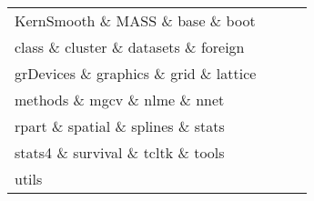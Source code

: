 \begin{tabular}{llll} 
KernSmooth \& MASS \& base \& boot\\ 
class \& cluster \& datasets \& foreign\\ 
grDevices \& graphics \& grid \& lattice\\ 
methods \& mgcv \& nlme \& nnet\\ 
rpart \& spatial \& splines \& stats\\ 
stats4 \& survival \& tcltk \& tools\\ 
utils  &   &   &   \\ 
\end{tabular}
